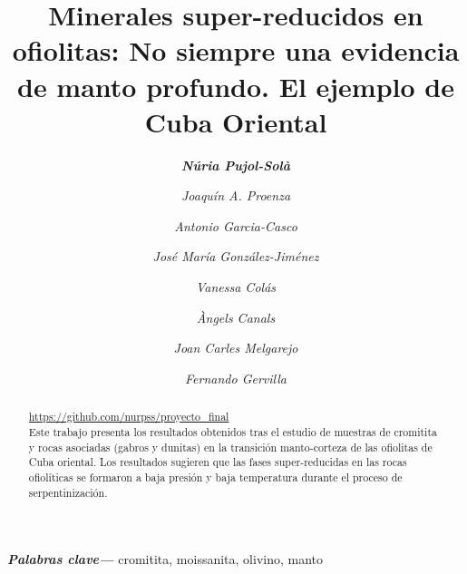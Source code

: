 \documentclass[a4paper,11pt]{article}
\providecommand{\keywords}[1]{\textbf{\textit{Palabras clave---}} #1}
\begin{document}
	\title {\bf Minerales super-reducidos en ofiolitas: No siempre una evidencia de manto profundo. El ejemplo de Cuba Oriental}
	\author[1]{\sl \bf Núria Pujol-Solà}
	\author[1]{\sl Joaquín A. Proenza}
	\author[2,3]{\sl Antonio Garcia-Casco}
	\author[2]{\sl José María González-Jiménez}
	\author[4]{\sl Vanessa Colás}
	\author[1]{\sl Àngels Canals}
	\author[1]{\sl Joan Carles Melgarejo}
	\author[2,3]{\sl Fernando Gervilla} 
	\renewcommand\Authands{ y }
	\date{}
	\maketitle
	\begin{abstract}
	\href{https://github.com/nurpss/proyecto_final}{https://github.com/nurpss/proyecto\_final}
	\\Este trabajo presenta los resultados obtenidos tras el estudio de muestras de cromitita y rocas asociadas (gabros y dunitas) en la transición manto-corteza de las ofiolitas de Cuba oriental. Los resultados sugieren que las fases super-reducidas en las rocas ofiolíticas se formaron a baja presión y baja temperatura durante el proceso de serpentinización.
	\end{abstract}
	\keywords{cromitita, moissanita, olivino, manto}
	 \\
\end{document}
